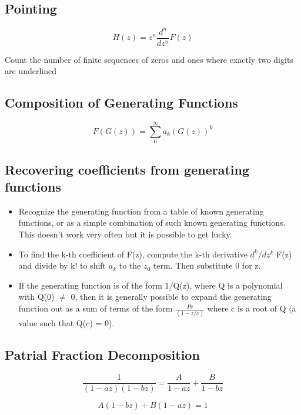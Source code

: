 \documentclass[twoside]{article}
\begin{document}
\subsection{Pointing}
\begin{equation}
H(z)= z^n \frac{d^n}{dz^n}F(z)
\end{equation}

Count the number of finite sequences of zeros and ones where exactly two digits are underlined

\subsection{Composition of Generating Functions}
\begin{equation}
    F(G(z)) = \sum_0^{\infty}a_k (G(z))^k
\end{equation}

\subsection{Recovering coefficients from generating functions}

\begin{itemize}
    \item Recognize the generating function from a table of known generating functions, or as a simple combination of such known generating functions. This doesn’t work very often but it is possible to get lucky.
    \item To find the k-th coefficient of F(z), compute the k-th derivative $d^k/dz^k$ F(z) and divide by k! to shift $a_k$ to the $z_0$ term. Then substitute 0 for z.
    \item If the generating function is of the form 1/Q(z), where Q is a polynomial
with Q(0) $\neq$ 0, then it is generally possible to expand the generating function out as a sum of terms of the form $\frac{Pc}{(1-z/c)}$ where c is a root of Q (a value such that Q(c) = 0).
\end{itemize}


\subsection{Patrial Fraction Decomposition}

\begin{equation}
    \frac{1}{(1-az)(1-bz)} = \frac{A}{1-az} + \frac{B}{1-bz}
\end{equation}

\begin{equation}
    A (1-bz) + B(1-az) = 1
\end{equation}
\end{document}
